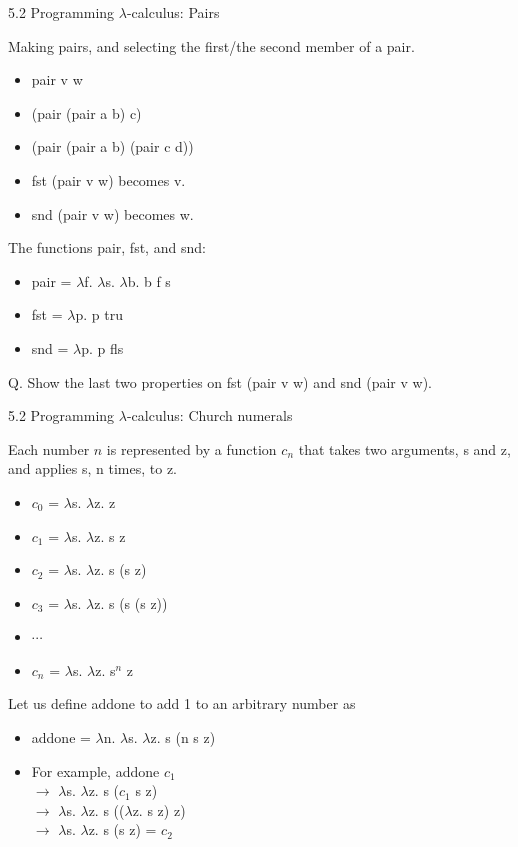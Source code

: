 \documentclass[table]{beamer}
\begin{document}
\begin{frame}[t]{5.2 Programming $\lambda$-calculus: Pairs} 

Making pairs, and selecting the first/the second member of a pair. 
\begin{itemize}
\item pair v w
\item (pair (pair a b) c)
\item (pair (pair a b) (pair c d))
\item fst (pair v w) becomes v.
\item snd (pair v w) becomes w.
\end{itemize}

\vspace{10pt}

The functions pair, fst, and snd:
\begin{itemize}
\item pair = $\lambda$f. $\lambda$s. $\lambda$b. b f s
\item fst = $\lambda$p. p tru
\item snd = $\lambda$p. p fls
\end{itemize}

\vspace{10pt}

Q. Show the last two properties on fst (pair v w) and snd (pair v w). 

\end{frame}

\begin{frame}[t]{5.2 Programming $\lambda$-calculus: Church numerals} 

Each number $n$ is represented by a function $c_n$ that takes two arguments, s and z, and applies s, n times, to z. 
\begin{itemize}
\item $c_0$ = $\lambda$s. $\lambda$z. z
\item $c_1$ = $\lambda$s. $\lambda$z. s z
\item $c_2$ = $\lambda$s. $\lambda$z. s (s z)
\item $c_3$ = $\lambda$s. $\lambda$z. s (s (s z))
\item $\cdots$
\item $c_n$ = $\lambda$s. $\lambda$z. s$^n$ z
\end{itemize}

\vspace{10pt}

Let us define addone to add 1 to an arbitrary number as
\begin{itemize}
\item addone = $\lambda$n. $\lambda$s. $\lambda$z. s (n s z)

\item For example, addone $c_1$ \\
$\rightarrow$ $\lambda$s. $\lambda$z. s ($c_1$ s z) \\
$\rightarrow$ $\lambda$s. $\lambda$z. s (($\lambda$z. s z) z) \\
$\rightarrow$ $\lambda$s. $\lambda$z. s (s z)
= $c_2$
\end{itemize}

\end{frame}
\end{document}
